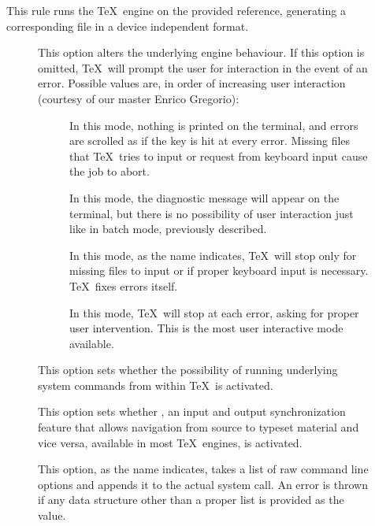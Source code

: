 \begin{description}
\item[]
This rule runs the  \TeX\ engine on the provided  reference, generating a corresponding file in a device independent format.

\begin{description}
\item[] This option alters the underlying engine behaviour. If this option is omitted, \TeX\ will prompt the user for interaction in the event of an error. Possible values are, in order of increasing user interaction (courtesy of our master Enrico Gregorio):

\begin{description}
\item[] In this mode, nothing is printed on the terminal, and errors are scrolled as if the  key is hit at every error. Missing files that \TeX\ tries to input or request from keyboard input cause the job to abort.

\item[] In this mode, the diagnostic message will appear on the terminal, but there is no possibility of user interaction just like in batch mode, previously described.

\item[] In this mode, as the name indicates, \TeX\ will stop only for missing files to input or if proper keyboard input is necessary. \TeX\ fixes errors itself.

\item[] In this mode, \TeX\ will stop at each error, asking for proper user intervention. This is the most user interactive mode available.
\end{description}

\item[] This option sets whether the possibility of running underlying system commands from within \TeX\ is activated.

\item[] This option sets whether , an input and output synchronization feature that allows navigation from source to typeset material and vice versa, available in most \TeX\ engines, is activated.

\item[] This option, as the name indicates, takes a list of raw command line options and appends it to the actual system call. An error is thrown if any data structure other than a proper list is provided as the value.
\end{description}


\end{description}
